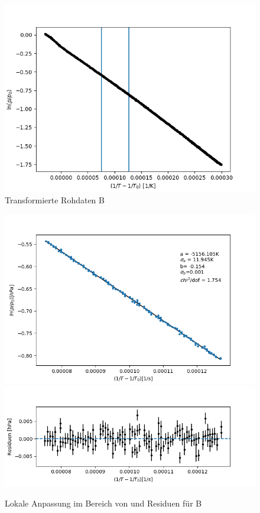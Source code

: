\documentclass[12pt,a4paper]{article}
\begin{document}
\begin{figure}[H]
\begin{center}
\includegraphics[width=\linewidth]{Bilder/log_RohdatenB}
\caption[Rohdaten logarith. B]{Transformierte Rohdaten B}
\label{fig:logB}
\end{center}
\end{figure}

\begin{figure}[H]
\begin{center}
\includegraphics[width=\linewidth]{Bilder/lokaler_fit_2B}\\
\includegraphics[width=\linewidth]{Bilder/lokale_residuen_2B}
\caption[Lokale Anpassung]{Lokale Anpassung im Bereich von  und Residuen für B}
\label{fig:fit_2B}
\end{center}
\end{figure}
\end{document}
